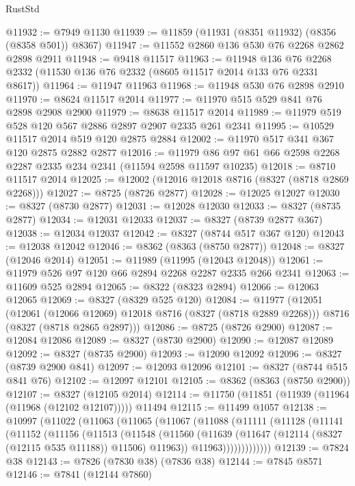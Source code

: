 \begin{lexlean}{RustStd}
\begin{coremodule}
@11932 := @7949 @1130
@11939 := @11859 (@11931 (@8351 @11932) (@8356 (@8358 @501)) @8367)
@11947 := @11552 @2860 @136 @530 @76 @2268 @2862 @2898 @2911
@11948 := @9418 @11517
@11963 := @11948
    @136
    @76
    @2268
    @2332
    (@11530 @136 @76 @2332 (@8605 @11517 @2014 @133 @76 @2331 @8617))
@11964 := @11947 @11963
@11968 := @11948 @530 @76 @2898 @2910
@11970 := @8624 @11517 @2014
@11977 := @11970 @515 @529 @841 @76 @2898 @2908 @2900
@11979 := @8638 @11517 @2014
@11989 := @11979 @519 @528 @120 @567 @2886 @2897 @2907 @2335 @261 @2341
@11995 := @10529 @11517 @2014 @519 @120 @2875 @2884
@12002 := @11970 @517 @341 @367 @120 @2875 @2882 @2877
@12016 := @11979 @86 @97 @61 @66 @2598 @2268 @2287 @2335 @234 @2341 (@11594 @2598 @11597 @10235)
@12018 := @8710 @11517 @2014
@12025 := @12002 (@12016 @12018 @8716 (@8327 (@8718 @2869 @2268)))
@12027 := @8725 (@8726 @2877)
@12028 := @12025 @12027
@12030 := @8327 (@8730 @2877)
@12031 := @12028 @12030
@12033 := @8327 (@8735 @2877)
@12034 := @12031 @12033
@12037 := @8327 (@8739 @2877 @367)
@12038 := @12034 @12037
@12042 := @8327 (@8744 @517 @367 @120)
@12043 := @12038 @12042
@12046 := @8362 (@8363 (@8750 @2877))
@12048 := @8327 (@12046 @2014)
@12051 := @11989 (@11995 (@12043 @12048))
@12061 := @11979 @526 @97 @120 @66 @2894 @2268 @2287 @2335 @266 @2341
@12063 := @11609 @525 @2894
@12065 := @8322 (@8323 @2894)
@12066 := @12063 @12065
@12069 := @8327 (@8329 @525 @120)
@12084 := @11977
    (@12051
      (@12061 (@12066 @12069) @12018 @8716 (@8327 (@8718 @2889 @2268)))
      @8716
      (@8327 (@8718 @2865 @2897)))
@12086 := @8725 (@8726 @2900)
@12087 := @12084 @12086
@12089 := @8327 (@8730 @2900)
@12090 := @12087 @12089
@12092 := @8327 (@8735 @2900)
@12093 := @12090 @12092
@12096 := @8327 (@8739 @2900 @841)
@12097 := @12093 @12096
@12101 := @8327 (@8744 @515 @841 @76)
@12102 := @12097 @12101
@12105 := @8362 (@8363 (@8750 @2900))
@12107 := @8327 (@12105 @2014)
@12114 := @11750 (@11851 (@11939 (@11964 (@11968 (@12102 @12107))))) @11494
@12115 := @11499 @1057
@12138 := @10997
    (@11022
      (@11063
        (@11065
          (@11067
            (@11088
              (@11111
                (@11128
                  (@11141
                    (@11152
                      (@11156
                        (@11513
                          (@11548
                            (@11560
                              (@11639 (@11647 (@12114 (@8327 (@12115 @535 @11188)) @11506) @11963))
                              @11963)))))))))))))
@12139 := @7824 @38
@12143 := @7826 (@7830 @38) (@7836 @38)
@12144 := @7845 @8571
@12146 := @7841 (@12144 @7860)

\end{coremodule}
\end{lexlean}
